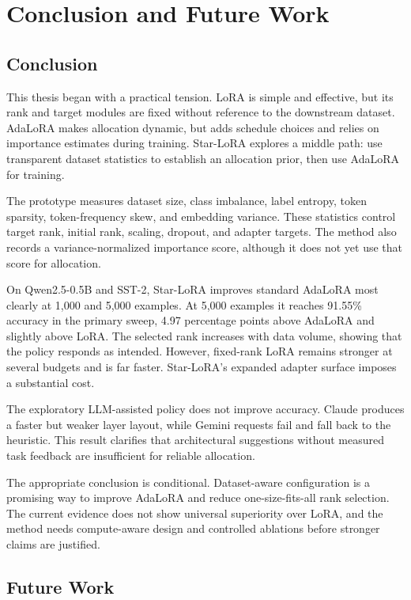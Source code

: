 \chapter{Conclusion and Future Work}
\label{chap:conclusion}

\section{Conclusion}

This thesis began with a practical tension. LoRA is simple and effective, but its rank and target
modules are fixed without reference to the downstream dataset. AdaLoRA makes allocation dynamic,
but adds schedule choices and relies on importance estimates during training. Star-LoRA explores a
middle path: use transparent dataset statistics to establish an allocation prior, then use
AdaLoRA for training.

The prototype measures dataset size, class imbalance, label entropy, token sparsity,
token-frequency skew, and embedding variance. These statistics control target rank, initial rank,
scaling, dropout, and adapter targets. The method also records a variance-normalized importance
score, although it does not yet use that score for allocation.

On Qwen2.5-0.5B and SST-2, Star-LoRA improves standard AdaLoRA most clearly at 1,000 and 5,000
examples. At 5,000 examples it reaches 91.55\% accuracy in the primary sweep, 4.97 percentage
points above AdaLoRA and slightly above LoRA. The selected rank increases with data volume, showing
that the policy responds as intended. However, fixed-rank LoRA remains stronger at several budgets
and is far faster. Star-LoRA's expanded adapter surface imposes a substantial cost.

The exploratory LLM-assisted policy does not improve accuracy. Claude produces a faster but weaker
layer layout, while Gemini requests fail and fall back to the heuristic. This result clarifies that
architectural suggestions without measured task feedback are insufficient for reliable allocation.

The appropriate conclusion is conditional. Dataset-aware configuration is a promising way to
improve AdaLoRA and reduce one-size-fits-all rank selection. The current evidence does not show
universal superiority over LoRA, and the method needs compute-aware design and controlled
ablations before stronger claims are justified.

\section{Future Work}

